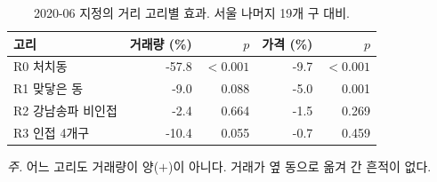 \begin{table}[htbp]
  \centering
  \caption{2020-06 지정의 거리 고리별 효과. 서울 나머지 19개 구 대비.}
  \label{tab:spill-rings}
  \begin{tabular}{lrrrr}
    \toprule
    \textbf{고리} & \textbf{거래량 (\%)} & \textbf{$p$} & \textbf{가격 (\%)} & \textbf{$p$} \\
    \midrule
    R0 처치동 & -57.8 & $<0.001$ & -9.7 & $<0.001$ \\
    R1 맞닿은 동 & -9.0 & 0.088 & -5.0 & 0.001 \\
    R2 강남송파 비인접 & -2.4 & 0.664 & -1.5 & 0.269 \\
    R3 인접 4개구 & -10.4 & 0.055 & -0.7 & 0.459 \\
    \bottomrule
  \end{tabular}

  \begin{minipage}{\linewidth}\footnotesize
  \textit{주.} 어느 고리도 거래량이 양($+$)이 아니다. 거래가 옆 동으로 옮겨 간 흔적이 없다.
  \end{minipage}
\end{table}
